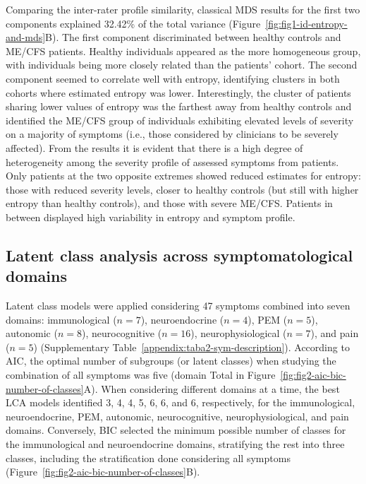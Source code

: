 Comparing the inter-rater profile similarity, classical MDS results for the first two components explained 32.42\% of the total variance (Figure~\ref{fig:fig1-id-entropy-and-mds}B).
The first component discriminated between healthy controls and ME/CFS patients.
Healthy individuals appeared as the more homogeneous group, with individuals being more closely related than the patients' cohort.
The second component seemed to correlate well with entropy, identifying clusters in both cohorts where estimated entropy was lower.
Interestingly, the cluster of patients sharing lower values of entropy was the farthest away from healthy controls and identified the ME/CFS group of individuals exhibiting elevated levels of severity on a majority of symptoms (i.e., those considered by clinicians to be severely affected).
From the results it is evident that there is a high degree of heterogeneity among the severity profile of assessed symptoms from patients.
Only patients at the two opposite extremes showed reduced estimates for entropy: those with reduced severity levels, closer to healthy controls (but still with higher entropy than healthy controls), and those with severe ME/CFS.
Patients in between displayed high variability in entropy and symptom profile.


\subsection{Latent class analysis across symptomatological domains}

Latent class models were applied considering 47 symptoms combined into seven domains: immunological ($n = 7$), neuroendocrine ($n = 4$), PEM ($n = 5$), autonomic ($n = 8$), neurocognitive ($n = 16$), neurophysiological ($n = 7$), and pain ($n = 5$) (Supplementary Table~\ref{appendix:taba2-sym-description}).
According to AIC, the optimal number of subgroups (or latent classes) when studying the combination of all symptoms was five (domain Total in Figure~\ref{fig:fig2-aic-bic-number-of-classes}A).
When considering different domains at a time, the best LCA models identified 3, 4, 4, 5, 6, 6, and 6, respectively, for the immunological, neuroendocrine, PEM, autonomic, neurocognitive, neurophysiological, and pain domains.
Conversely, BIC selected the minimum possible number of classes for the immunological and neuroendocrine domains, stratifying the rest into three classes, including the stratification done considering all symptoms (Figure~\ref{fig:fig2-aic-bic-number-of-classes}B).

